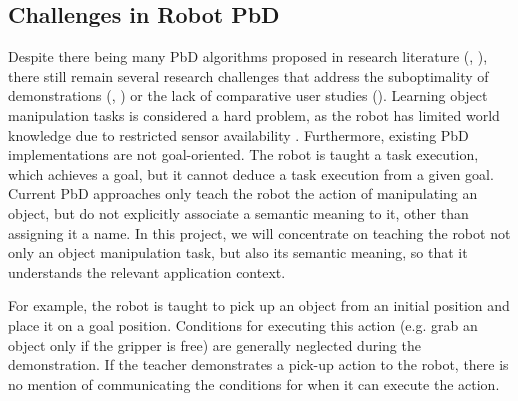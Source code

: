\subsection{Challenges in Robot PbD}
Despite there being many PbD algorithms proposed in research literature (\cite{argall2009survey}, \cite{billing2010formalism}), there still remain several research challenges that address the suboptimality of demonstrations (\cite{chen2003programing}, \cite{kaiser1995obtaining}) or the lack of comparative user studies (\cite{suay2012practical}).
Learning object manipulation tasks is considered a hard problem, as the robot has limited world knowledge due to restricted sensor availability \cite{ekvall2008robot}. 
Furthermore, existing PbD implementations are not goal-oriented. The robot is taught a task execution, which achieves a goal, but it cannot deduce a task execution from a given goal. Current PbD approaches only teach the robot the action of manipulating an object, but do not explicitly associate a semantic meaning to it, other than assigning it a  name. In this project, we will concentrate on teaching the robot not only an object manipulation task, but also its semantic meaning, so that it understands the relevant application context.

For example, the robot is taught to pick up an object from an initial position and place it on a goal position. Conditions for executing this action (e.g. grab an object only if the gripper is free) are generally neglected during the demonstration. %
If the teacher demonstrates a pick-up action to the robot, there is no mention of communicating the conditions for when it can execute the action. 


